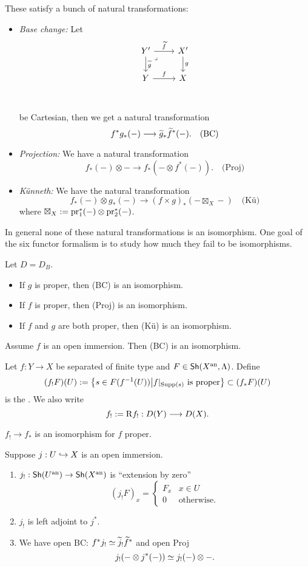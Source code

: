 These satisfy a bunch of natural transformations:
\begin{itemize}
\item \emph{Base change:} Let
\[
\begin{tikzcd}
Y' \ar[r,"\wt{f}"] \ar[d,"\wt{g}"] & X' \ar[d,"g"] \\ Y \ar[r,"f"] & X\\
\arrow["\lrcorner"{anchor=center, pos=0.125},
draw=none, from=1-1, to=2-2]
\end{tikzcd}
\]
be Cartesian, then we get a natural transformation
\[
f^{*}g_*(-)\to \wt{g}_*\wt{f}^{*}(-).\quad\text{(BC)}
\]
\item \emph{Projection:} We have a natural transformation
\[
f_*(-)\otimes - \to f_*(-\otimes f^{*}(-)).\quad\text{(Proj)}
\]
\item \emph{K\"unneth:} We have the natural transformation
\[
f_*(-)\otimes g_*(-) \to (f\times g)_*(-\boxtimes_X -)\quad\text{(K\"u)}
\]
where $\boxtimes_X:= \operatorname{pr}_1^{*}(-)\otimes \operatorname{pr}_2^{*}(-)$.
\end{itemize}
In general none of these natural transformations is an isomorphism. One goal of the six
functor formalism is to study how much they fail to be isomorphisms.
\begin{theorem}
Let $D=D_B$.
\begin{itemize}
\item If $g$ is proper, then (BC) is an isomorphism.
\item If $f$ is proper, then (Proj) is an isomorphism.
\item If $f$ and $g$ are both proper, then (K\"u) is an isomorphism.
\end{itemize}
\end{theorem}
\begin{proposition}
Assume $f$ is an open immersion. Then (BC) is an isomorphism.
\end{proposition}
\begin{definition}
Let $f:Y\to X$ be separated of finite type and $F\in \mathsf{Sh}(X^\text{an},\Lambda)$. Define
\[
(f_!F)(U) := \left\{ s\in F(f^{-1}(U)) \middle| f|_{\operatorname{Supp}(s)}\text{ is proper}
\right\} \subset (f_*F)(U)
\]
is the . We also write
\[
f_! \defeq \RD f_!:D(Y)\to D(X).
\]
\end{definition}
$f_!\to f_*$ is an isomorphism for $f$ proper. %
\begin{lemma}
Suppose $j:U\hookrightarrow X$ is an open immersion.
\begin{enumerate}[1)]
\item $j_!:\Sh(U\an)\to \Sh(X\an)$ is ``extension by zero''
\[
(j_!F)_x =
\begin{cases}
F_x  & x\in U \\
0 & \text{otherwise}.
\end{cases}
\]
\item $j_!$ is left adjoint to $j^{*}$.
\item We have open BC: $f^{*}j_!\simeq \widetilde{j}_!\widetilde{f}^{*}$ and open Proj
\[
j_!(-\otimes j^{*}(-)) \simeq j_!(-) \otimes -.
\]
\end{enumerate}
\end{lemma}
